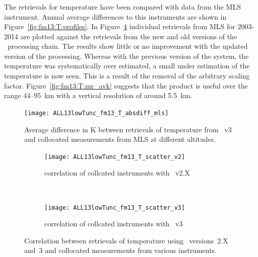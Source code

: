 
\subsubsection{}
\label{sec:fm13:comparison:temperature}
The retrievals for temperature have been compared with data from the MLS
instrument. Annual average differences to this instruments are shown in
Figure~\ref{fig:fm13:T:profiles}. In Figure~\ref{fig:fm13:T:scatter} individual
retrievals from MLS for 2003-2014 are plotted against the retrievals
from the new and old versions of the \smr\ processing chain. The results show
little or no improvement with the updated version of the processing. Whereas
with the previous version of the system, the temperature was systematically
over estimated, a small under estimation of the temperature is now seen. This
is a result of the removal of the arbitrary scaling factor.
Figure~\ref{fig:fm13:T:mr_avk} suggests that the product is useful over the
range 44--95~km with a vertical resolution of around 5.5~km.

\begin{figure}[tbhp]
    \centering
    \texttt{[image: ALL13lowTunc\_fm13\_T\_absdiff\_mls]}
    \caption{Average difference in K between retrievals of temperature from
    \smr~v3 and collocated measurements from MLS at different altitudes.}
    \label{fig:fm13:T:profiles}
        \label{fig:fm13:T:profiles:MLS}
\end{figure}

\begin{figure}[tbhp]
    \centering
    \begin{subfigure}[b]{0.49\textwidth}
        \texttt{[image: ALL13lowTunc\_fm13\_T\_scatter\_v2]}
        \caption{correlation of collcated instruments with \smr~v2.X}
        \label{fig:fm13:T:scatter:v2}
    \end{subfigure}
    \,
    \begin{subfigure}[b]{0.49\textwidth}
        \texttt{[image: ALL13lowTunc\_fm13\_T\_scatter\_v3]}
        \caption{correlation of collcated instruments with \smr~v3}
        \label{fig:fm13:T:scatter:v3}
    \end{subfigure}
    \caption{Correlation between retrievals of temperature using \smr\
    versions~2.X and~3 and collocated measurements from various instruments.}
    \label{fig:fm13:T:scatter}
\end{figure}


